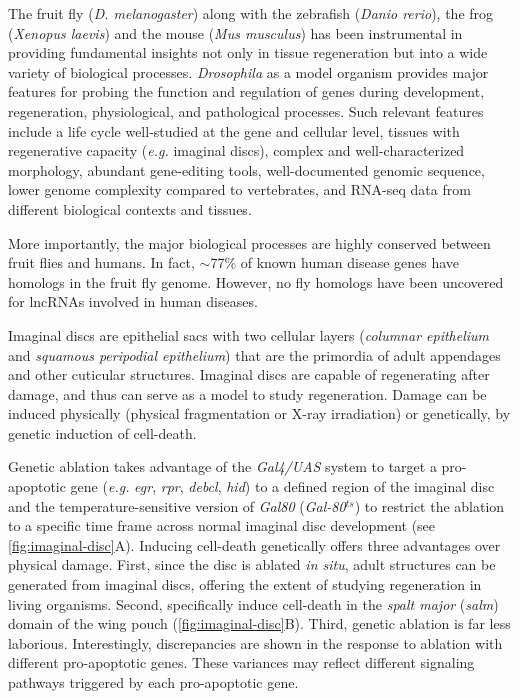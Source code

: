 The fruit fly (\textit{D. melanogaster}) along with the zebrafish (\textit{Danio rerio}), the frog (\textit{Xenopus laevis}) and the mouse (\textit{Mus musculus}) has been instrumental in providing fundamental insights not only in tissue regeneration but into a wide variety of biological processes. \textit{Drosophila} as a model organism provides major features for probing the function and regulation of genes during development, regeneration, physiological, and pathological processes. Such relevant features include a life cycle well-studied at the gene and cellular level, tissues with regenerative capacity (\textit{e.g.} imaginal discs), complex and well-characterized morphology, abundant gene-editing tools, well-documented genomic sequence, lower genome complexity compared to vertebrates, and RNA-seq data from different biological contexts and tissues. 

More importantly, the major biological processes are highly conserved between fruit flies and humans. In fact, $\sim$77\% of known human disease genes have homologs in the fruit fly genome.\autocite{ji_2019_understanding} However, no fly homologs have been uncovered for lncRNAs involved in human diseases. 

Imaginal discs are epithelial sacs with two cellular layers (\textit{columnar epithelium} and \textit{squamous peripodial epithelium}) that are the primordia of adult appendages and other cuticular structures. Imaginal discs are capable of regenerating after damage, and thus can serve as a model to study regeneration.\autocite{vizcaya_2018,hariharan_2017_imaginal,vizcaya_2020_chromatin} Damage can be induced physically (physical fragmentation or X-ray irradiation) or genetically, by genetic induction of cell-death.\autocite{hariharan_2017_imaginal}

Genetic ablation takes advantage of the \textit{Gal4/UAS} system to target a pro-apoptotic gene (\textit{e.g.} \textit{egr}, \textit{rpr}, \textit{debcl}, \textit{hid}) to a defined region of the imaginal disc and the temperature-sensitive version of \textit{Gal80} (\textit{Gal-80}$^{ts}$) to restrict the ablation to a specific time frame across normal imaginal disc development\autocite{hariharan_2017_imaginal,vizcaya_2018,santabarbara_2015} (see \autoref{fig:imaginal-disc}A). Inducing cell-death genetically offers three advantages over physical damage. First, since the disc is ablated \textit{in situ}, adult structures can be generated from imaginal discs, offering the extent of studying regeneration in living organisms. Second, specifically induce cell-death in the \textit{spalt major} (\textit{salm}) domain of the wing pouch (\autoref{fig:imaginal-disc}B). Third, genetic ablation is far less laborious. Interestingly, discrepancies are shown in the response to ablation with different pro-apoptotic genes.\autocite{hariharan_2017_imaginal} These variances may reflect different signaling pathways triggered by each pro-apoptotic gene.  

